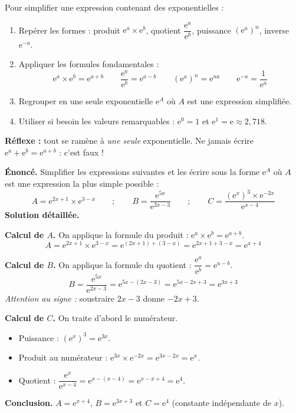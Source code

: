 \documentclass[11pt]{article}
\begin{document}
\begin{methode}
Pour simplifier une expression contenant des exponentielles :
\begin{enumerate}
\item Repérer les formes : produit $\mathrm{e}^a \times \mathrm{e}^b$, quotient $\dfrac{\mathrm{e}^a}{\mathrm{e}^b}$, puissance $\left(\mathrm{e}^a\right)^n$, inverse $\mathrm{e}^{-a}$.
\item Appliquer les formules fondamentales :
\[ \mathrm{e}^a \times \mathrm{e}^b = \mathrm{e}^{a+b} \qquad \dfrac{\mathrm{e}^a}{\mathrm{e}^b} = \mathrm{e}^{a-b} \qquad \left(\mathrm{e}^a\right)^n = \mathrm{e}^{na} \qquad \mathrm{e}^{-a} = \dfrac{1}{\mathrm{e}^a} \]
\item Regrouper en une seule exponentielle $\mathrm{e}^{A}$ où $A$ est une expression simplifiée.
\item Utiliser si besoin les valeurs remarquables : $\mathrm{e}^0 = 1$ et $\mathrm{e}^1 = \mathrm{e} \approx 2{,}718$.
\end{enumerate}
\textbf{Réflexe :} tout se ramène à \emph{une seule} exponentielle. Ne jamais écrire $\mathrm{e}^a + \mathrm{e}^b = \mathrm{e}^{a+b}$ : c'est faux !
\end{methode}

\begin{exoresolu}
\textbf{Énoncé.} Simplifier les expressions suivantes et les écrire sous la forme $\mathrm{e}^{A}$ où $A$ est une expression la plus simple possible :
\[ A = \mathrm{e}^{2x+1} \times \mathrm{e}^{3-x} \qquad ; \qquad B = \dfrac{\mathrm{e}^{5x}}{\mathrm{e}^{2x-3}} \qquad ; \qquad C = \dfrac{\left(\mathrm{e}^{x}\right)^3 \times \mathrm{e}^{-2x}}{\mathrm{e}^{x-4}} \]
\tcblower
\textbf{Solution détaillée.}

\textbf{Calcul de $A$.} On applique la formule du produit : $\mathrm{e}^a \times \mathrm{e}^b = \mathrm{e}^{a+b}$.
\[ A = \mathrm{e}^{2x+1} \times \mathrm{e}^{3-x} = \mathrm{e}^{(2x+1)+(3-x)} = \mathrm{e}^{2x+1+3-x} = \mathrm{e}^{x+4} \]

\textbf{Calcul de $B$.} On applique la formule du quotient : $\dfrac{\mathrm{e}^a}{\mathrm{e}^b} = \mathrm{e}^{a-b}$.
\[ B = \dfrac{\mathrm{e}^{5x}}{\mathrm{e}^{2x-3}} = \mathrm{e}^{5x-(2x-3)} = \mathrm{e}^{5x-2x+3} = \mathrm{e}^{3x+3} \]
\emph{Attention au signe :} soustraire $2x-3$ donne $-2x+3$.

\textbf{Calcul de $C$.} On traite d'abord le numérateur.
\begin{itemize}
\item Puissance : $\left(\mathrm{e}^{x}\right)^3 = \mathrm{e}^{3x}$.
\item Produit au numérateur : $\mathrm{e}^{3x} \times \mathrm{e}^{-2x} = \mathrm{e}^{3x-2x} = \mathrm{e}^{x}$.
\item Quotient : $\dfrac{\mathrm{e}^{x}}{\mathrm{e}^{x-4}} = \mathrm{e}^{x-(x-4)} = \mathrm{e}^{x-x+4} = \mathrm{e}^{4}$.
\end{itemize}

\textbf{Conclusion.} $A = \mathrm{e}^{x+4}$, $B = \mathrm{e}^{3x+3}$ et $C = \mathrm{e}^{4}$ (constante indépendante de $x$).
\end{exoresolu}
\end{document}

